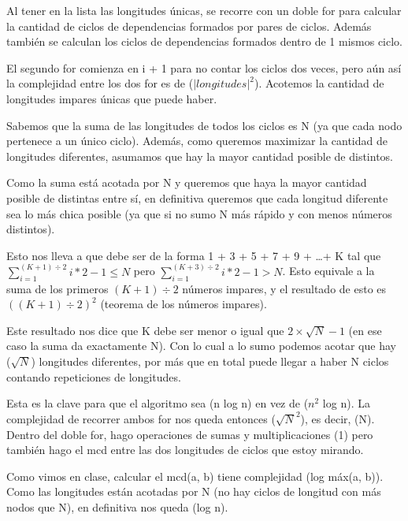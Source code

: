 	Al tener en la lista las longitudes únicas, se recorre con un doble for para calcular la cantidad de ciclos de dependencias formados por pares de ciclos. Además también se calculan los ciclos de dependencias formados dentro de 1 mismos ciclo. \newline

	El segundo for comienza en i + 1 para no contar los ciclos dos veces, pero aún así la complejidad entre los dos for es de \bigo($|longitudes|^2$). Acotemos la cantidad de longitudes impares únicas que puede haber. \newline

	Sabemos que la suma de las longitudes de todos los ciclos es N (ya que cada nodo pertenece a un único ciclo). Además, como queremos maximizar la cantidad de longitudes diferentes, asumamos que hay la mayor cantidad posible de distintos. \newline

	Como la suma está acotada por N y queremos que haya la mayor cantidad posible de distintas entre sí, en definitiva queremos que cada longitud diferente sea lo más chica posible (ya que si no sumo N más rápido y con menos números distintos). \newline

	Esto nos lleva a que debe ser de la forma 1 + 3 + 5 + 7 + 9 + \ldots + K tal que $\sum_{i = 1}^{(K + 1) \div 2}{i * 2 - 1} \leq N $ pero $\sum_{i = 1}^{(K + 3) \div 2}{i * 2 - 1} > N $. Esto equivale a la suma de los primeros $(K + 1) \div 2$ números impares, y el resultado de esto es $((K + 1) \div 2)^2$ (teorema de los números impares). \newline

	Este resultado nos dice que K debe ser menor o igual que $2 \times \sqrt{N} - 1$ (en ese caso la suma da exactamente N). Con lo cual a lo sumo podemos acotar que hay \bigo($\sqrt{N}$) longitudes diferentes, por más que en total puede llegar a haber N ciclos contando repeticiones de longitudes. \newline

	Esta es la clave para que el algoritmo sea \bigo(n log n) en vez de \bigo($n^2$ log n). La complejidad de recorrer ambos for nos queda entonces \bigo($\sqrt{N}^2$), es decir, \bigo(N). Dentro del doble for, hago operaciones de sumas y multiplicaciones \bigo(1) pero también hago el mcd entre las dos longitudes de ciclos que estoy mirando. \newline

	Como vimos en clase, calcular el mcd(a, b) tiene complejidad \bigo(log máx(a, b)). Como las longitudes están acotadas por N (no hay ciclos de longitud con más nodos que N), en definitiva nos queda \bigo(log n). \newline

